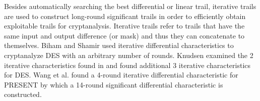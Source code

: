 Besides automatically searching the best differential or linear trail, iterative trails are used to construct long-round significant trails in order to efficiently obtain exploitable trails for cryptanalysis. Iterative trails refer to trails that have the same input and output difference (or mask) and thus they can concatenate to themselves. Biham and Shamir used iterative differential characteristics to cryptanalyze DES with an arbitrary number of rounds\cite{BS91,BS92}. Knudsen examined the 2 iterative characteristics found in \cite{BS91,BS92} and found additional 3 iterative characteristics for DES\cite{K92}. Wang et al. found a 4-round iterative differential characteristic for PRESENT by which a 14-round significant differential characteristic is constructed\cite{W08}. 

